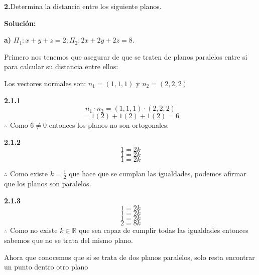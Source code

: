 \documentclass{article}
\begin{document}
\textbf{2.}Determina la distancia entre los siguiente planos.
\vspace{10pt}

\textbf{Solución:}
\vspace*{10pt}

\textbf{a)} $\Pi_1 :x+y+z=2;\Pi_2 :2x+2y+2z=8$.
\vspace{10pt}

Primero nos tenemos que asegurar de que se traten de planos paralelos entre si para calcular su distancia entre ellos:

Los vectores normales son: $n_1 =(1,1,1)$ y $n_2 = (2,2,2)$

\textbf{2.1.1}
$$n_1\cdot n_2 = (1,1,1) \cdot (2,2,2)$$
$$= 1(2)+1(2)+1(2) = 6$$
$\therefore$ Como $6\neq 0$ entonces los planos no son ortogonales. 
\vspace{10pt}

\textbf{2.1.2}
$$1 = 2k$$
$$1 = 2k$$
$$1 = 2k$$

$\therefore$ Como existe $k=\frac{1}{2}$ que hace que se cumplan las igualdades, podemos afirmar que los planos son paralelos.
\vspace{10pt}

\textbf{2.1.3}
$$1 = 2k$$
$$1 = 2k$$
$$1 = 2k$$
$$2 = 8k$$
$\therefore$ Como no existe $k \in \mathbb{R}$ que sea capaz de cumplir todas las igualdades entonces sabemos que no se trata del mismo plano. 

Ahora que conocemos que si se trata de dos planos paralelos, solo resta encontrar un punto dentro otro plano 
 
\end{document}
